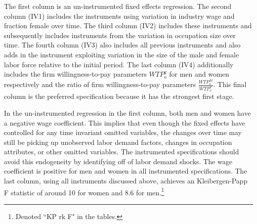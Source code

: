 \documentclass[11pt]{article}
\begin{document}
The first column is an un-instrumented fixed effects regression. The second column (IV1) includes the instruments using variation in industry wage and fraction female over time. The third column (IV2) includes these instruments and subsequently includes instruments from the variation in occupation size over time. The fourth column (IV3) also includes all previous instruments and also adds in the instrument exploiting variation in the size of the male and female labor force relative to the initial period. The last column (IV4) additionally includes the firm willingness-to-pay parameters $WTP^g_o$ for men and women respectively and the ratio of firm willingness-to-pay parameters  $\frac{WTP^M_o}{WTP^F_o}$. This final column is the preferred specification because it has the strongest first stage.




%
%
%
%
%
%
%
%
%
%
%
%



In the un-instrumented regression in the first column, both men and women have a negative wage coefficient. This implies that even though the fixed effects have controlled for any time invariant omitted variables, the changes over time may still be picking up unobserved labor demand factors, changes in occupation attributes, or other omitted variables. The instrumented specifications should avoid this endogeneity by identifying off of labor demand shocks. The wage coefficient is positive for men and women in all instrumented specifications. The last column, using all instruments discussed above, achieves an Kleibergen-Papp F statistic of around 10 for women and 8.6 for men.\footnote{Denoted ``KP rk F" in the tables.}
\end{document}
